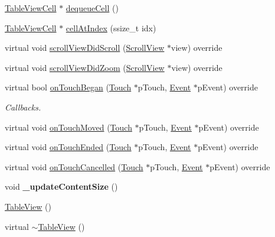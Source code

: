 \begin{DoxyCompactItemize}
\item 
\hyperlink{classTableViewCell}{Table\+View\+Cell} $\ast$ \hyperlink{classTableView_a0ee5c0422aa304daea662b1c1fdeb723}{dequeue\+Cell} ()
\item 
\hyperlink{classTableViewCell}{Table\+View\+Cell} $\ast$ \hyperlink{classTableView_a629f0d9b1261ba105583e03ec3cf69bc}{cell\+At\+Index} (ssize\+\_\+t idx)
\item 
virtual void \hyperlink{classTableView_a021ba3adef24829362018d36f4a08621}{scroll\+View\+Did\+Scroll} (\hyperlink{classScrollView}{Scroll\+View} $\ast$view) override
\item 
virtual void \hyperlink{classTableView_a5c83605ee0059fa74e9c184301cbb368}{scroll\+View\+Did\+Zoom} (\hyperlink{classScrollView}{Scroll\+View} $\ast$view) override
\item 
virtual bool \hyperlink{classTableView_a57908fcd3fe592e50ff721dd84675a01}{on\+Touch\+Began} (\hyperlink{classTouch}{Touch} $\ast$p\+Touch, \hyperlink{classEvent}{Event} $\ast$p\+Event) override
\begin{DoxyCompactList}\small\item\em Callbacks. \end{DoxyCompactList}\item 
virtual void \hyperlink{classTableView_acd131e5fa29332743e625a1a0d047965}{on\+Touch\+Moved} (\hyperlink{classTouch}{Touch} $\ast$p\+Touch, \hyperlink{classEvent}{Event} $\ast$p\+Event) override
\item 
virtual void \hyperlink{classTableView_a0d96aaf8ac40256ed144565beaaf76aa}{on\+Touch\+Ended} (\hyperlink{classTouch}{Touch} $\ast$p\+Touch, \hyperlink{classEvent}{Event} $\ast$p\+Event) override
\item 
virtual void \hyperlink{classTableView_a5ed81baf58526698abefaf8ca08a6c01}{on\+Touch\+Cancelled} (\hyperlink{classTouch}{Touch} $\ast$p\+Touch, \hyperlink{classEvent}{Event} $\ast$p\+Event) override
\item 
\mbox{\label{classTableView_a7a77e69d84a47f298dbc3ce078c89db7}} 
void {\bfseries \+\_\+update\+Content\+Size} ()
\item 
\hyperlink{classTableView_a5af30a8dfb5cc01b5bd2db1ac59e91fd}{Table\+View} ()
\item 
virtual \hyperlink{classTableView_a37d3730d6416dc370e9882c971016061}{$\sim$\+Table\+View} ()
\item 
\mbox{\label{classTableView_a166e7f7de745477be219d3027c0cb234}} 

\end{DoxyCompactItemize}
